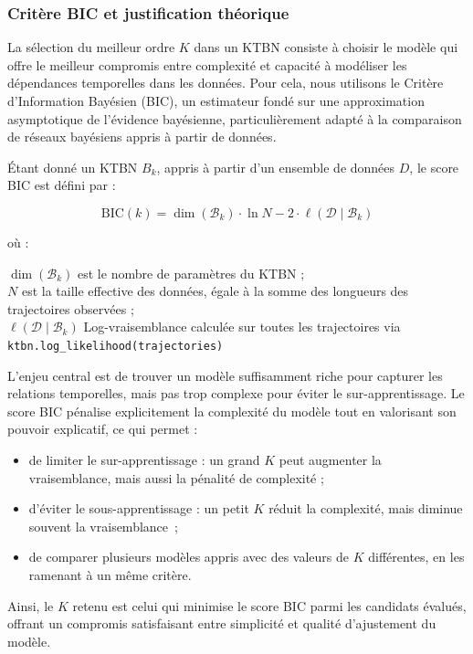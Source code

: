 \documentclass{article}
\begin{document}
\subsubsection{Critère BIC et justification théorique}

La sélection du meilleur ordre $K$ dans un KTBN consiste à choisir le modèle qui offre le meilleur compromis
entre complexité et capacité à modéliser les dépendances temporelles dans les données. Pour cela, nous
utilisons le Critère d'Information Bayésien (BIC), un estimateur fondé sur une approximation asymptotique de
l'évidence bayésienne, particulièrement adapté à la comparaison de réseaux bayésiens appris à partir de
données\cite{schwarz1978}.

Étant donné un KTBN $B_k$, appris à partir d'un ensemble de données $D$, le score BIC est défini par :

$$
    \mathrm{BIC}(k) = \dim(\mathcal{B}_k) \cdot \ln N - 2 \cdot \ell(\mathcal{D} \mid \mathcal{B}_k)
$$

où :


$\dim(\mathcal{B}_k)$ est le nombre de paramètres du KTBN ;\\
$N$ est la taille effective des données, égale à la somme des longueurs des trajectoires observées ;\\
$\ell(\mathcal{D} \mid \mathcal{B}_k)$ Log-vraisemblance calculée sur toutes les trajectoires
via \texttt{ktbn.log\_likelihood(trajectories)}

L'enjeu central est de trouver un modèle suffisamment riche pour capturer les relations temporelles, mais pas
trop complexe pour éviter le sur-apprentissage. Le score BIC pénalise explicitement la complexité du modèle tout
en valorisant son pouvoir explicatif, ce qui permet :

\begin{itemize}
    \item de limiter le sur-apprentissage : un grand $K$ peut augmenter la vraisemblance, mais aussi la
          pénalité de complexité ;
    \item d'éviter le sous-apprentissage : un petit $K$ réduit la complexité, mais diminue souvent la vraisemblance~;
    \item de comparer plusieurs modèles appris avec des valeurs de $K$ différentes, en les
          ramenant à un même critère.
\end{itemize}

Ainsi, le $K$ retenu est celui qui minimise le score BIC parmi les candidats évalués, offrant un compromis
satisfaisant entre simplicité et qualité d'ajustement du modèle.
\end{document}
